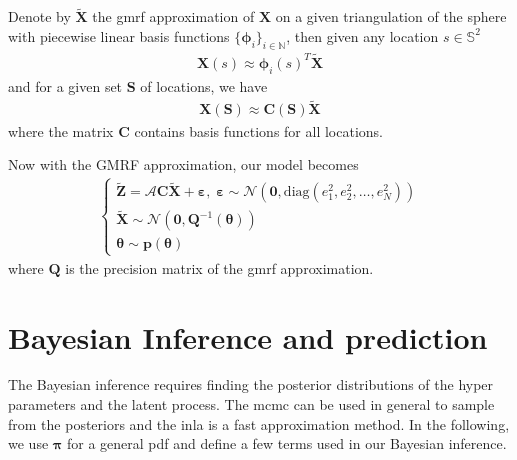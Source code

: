 \documentclass[a4paper,12pt]{article}
\begin{document}
Denote by $\bm{\tilde{X}}$ the \acrshort{gmrf} approximation of $\bm{X}$ on a given triangulation of the sphere with piecewise linear basis functions $\{ \bm{\phi}_i \}_{i \in \mathbb{N}}$, then given any location $s \in \mathbb{S}^2$
\begin{align}
\bm{X}(s) \approx \bm{\phi}_i(s)^T\bm{\tilde{X}}
\end{align}
and for a given set $\bm{S}$ of locations, we have  
\begin{align}
\bm{X}(\bm{S}) \approx \bm{C}(\bm{S})\bm{\tilde{X}}
\end{align}
where the matrix $\bm{C}$ contains basis functions for all locations.

Now with the GMRF approximation, our model becomes
\begin{align}
\left\{ \begin{array}{l}
\bm{\tilde{Z}} = \bm{\mathcal{A}}\bm{C}\bm{\tilde{X}} + \bm{\varepsilon}, \; 
\bm{\varepsilon} \sim \mathcal{N} (\bm{0}, \mbox{diag}(e_1^2, e_2^2, \dots, e_N^2)) \\
\bm{\tilde{X}} \sim \mathcal{N}(\bm{0}, \bm{Q}^{-1}(\bm{\theta})) \\
\bm{\theta} \sim \bm{p}(\bm{\theta})
\end{array} \right.
\end{align}
where $\bm{Q}$ is the precision matrix of the \acrshort{gmrf} approximation.

\section{Bayesian Inference and prediction}
The Bayesian inference requires finding the posterior distributions of the hyper parameters and the latent process. The \acrfull{mcmc} can be used in general to sample from the posteriors and the \acrfull{inla} is a fast approximation method. In the following, we use $\bm{\pi}$ for a general \acrshort{pdf} and define a few terms used in our Bayesian inference.
\end{document}
